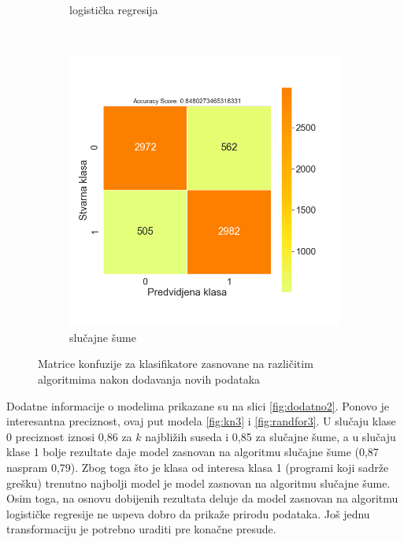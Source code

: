 \documentclass[12pt,oneside]{memoir}
\begin{document}
\begin{figure}[!ht]
\begin{subfigure}[b]{0.45\textwidth}
        \caption{logistička regresija}
        \label{fig:logreg2}
    \end{subfigure}
    \\
    \begin{subfigure}[b]{0.45\textwidth}
        \centering
        \includegraphics[width=\textwidth]{RF_oversampled_confussion_matrix}
        \caption{slučajne šume}
        \label{fig:randfor2}
    \end{subfigure}
    \caption{Matrice konfuzije za klasifikatore zasnovane na različitim algoritmima nakon dodavanja novih podataka}
    \label{fig:confmatrovers}
\end{figure}

Dodatne informacije o modelima prikazane su na slici \ref{fig:dodatno2}. Ponovo je interesantna preciznost, ovaj put modela \ref{fig:kn3} i \ref{fig:randfor3}. U slučaju klase 0 preciznost iznosi 0,86 za $k$ najbližih suseda i 0,85 za slučajne šume, a u slučaju klase 1 bolje rezultate daje model zasnovan na algoritmu slučajne šume (0,87 naspram 0,79). Zbog toga što je klasa od interesa klasa 1 (programi koji sadrže grešku) trenutno najbolji model je model zasnovan na algoritmu slučajne šume. Osim toga, na osnovu dobijenih rezultata deluje da model zasnovan na algoritmu logističke regresije ne uspeva dobro da prikaže prirodu podataka. Još jednu transformaciju je potrebno uraditi pre konačne presude.
\end{document}
